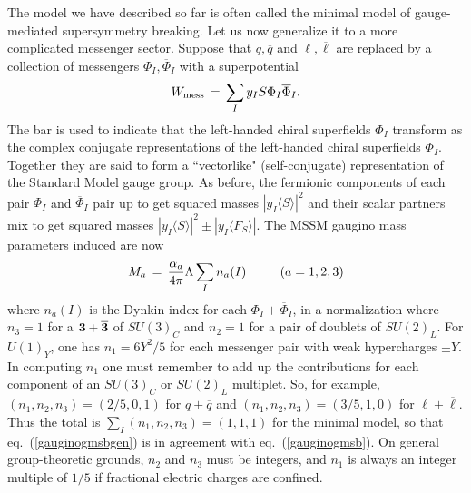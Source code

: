 \documentclass[11pt]{article}
\def\beq{\begin{eqnarray}}
\def\eeq{\end{eqnarray}}
\begin{document}
The model we have described so far is often called the minimal model of 
gauge-mediated supersymmetry breaking. Let us now generalize it to a more 
complicated messenger sector. Suppose that $q, \overline q$ and $\ell, 
\overline \ell $ are replaced by a collection of messengers 
$\Phi_I,\overline \Phi_I$ with a superpotential
\beq
W_{\rm mess} \,=\, \sum_I y_I S \Phi_I \overline \Phi_I . 
\eeq
The bar is used to indicate that the left-handed chiral superfields 
$\overline \Phi_I$ transform as the complex conjugate representations of 
the left-handed chiral superfields $\Phi_I$. Together they are said to 
form a ``vectorlike" (self-conjugate) representation of the Standard Model gauge 
group. As before, the fermionic components of each pair $\Phi_I$ and 
$\overline\Phi_I$ pair up to get squared masses $|y_I \langle S 
\rangle|^2$ and their scalar partners mix to get squared masses $|y_I 
\langle S \rangle|^2 \pm |y_I \langle F_S \rangle | $. The MSSM gaugino 
mass parameters induced are now
\beq
M_a \,=\, {\alpha_a\over 4\pi} \Lambda \sum_I n_a(I) \qquad\>\>\>(a=1,2,3)
\label{gauginogmsbgen}
\eeq
where $n_a(I)$ is the Dynkin index for each $\Phi_I+\overline \Phi_I$, in 
a normalization where $n_3 = 1$ for a ${\bf 3} + {\bf \overline 3}$ of 
$SU(3)_C$ and $n_2 = 1$ for a pair of doublets of $SU(2)_L$. For $U(1)_Y$, 
one has $n_1 = 6Y^2/5$ for each messenger pair with weak hypercharges $\pm 
Y$.  In computing $n_1$ one must remember to add up the contributions for 
each component of an $SU(3)_C$ or $SU(2)_L$ multiplet. So, for example, 
$(n_1, n_2, n_3) = (2/5, 0, 1)$ for $q+\overline q$ and $(n_1, n_2, n_3) = 
(3/5, 1, 0)$ for $\ell+\overline \ell$. Thus the total is $\sum_I (n_1, 
n_2, n_3) = (1, 1, 1)$ for the minimal model, so that 
eq.~(\ref{gauginogmsbgen}) is in agreement with eq.~(\ref{gauginogmsb}). 
On general group-theoretic grounds, $n_2$ and $n_3$ must be integers, and 
$n_1$ is always an integer multiple of $1/5$ if fractional electric 
charges are confined.
\end{document}
